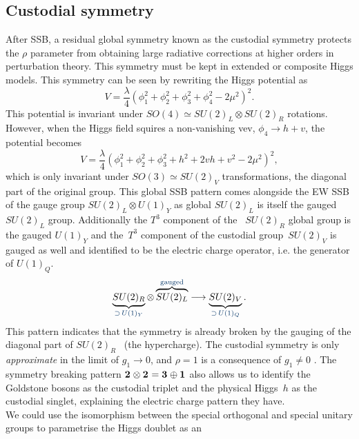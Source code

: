 \subsection{Custodial symmetry}
After SSB, a residual global symmetry known as the custodial symmetry protects the $\rho$ parameter from obtaining large radiative corrections at higher orders in perturbation theory.  This symmetry must be kept in extended or composite Higgs models. This symmetry can be seen by rewriting the Higgs potential as
\begin{equation}
	V = \frac{\lambda}{4} \left( \phi_1^2+\phi^2_2+\phi_3^2+\phi^2_4 -2 \mu^2\right)^2.
\end{equation}
This potential is invariant under $SO(4)\simeq SU(2)_L \otimes SU(2)_R$ rotations. However, when the Higgs field squires a non-vanishing vev,  $ \phi_4 \to h+v$, the potential becomes
 \begin{equation}
 	V = \frac{\lambda}{4} \left( \phi_1^2+\phi^2_2+\phi_3^2+ h^2+2vh+v^2 -2 \mu^2\right)^2,
 \end{equation}
which is only invariant under  $SO(3)\simeq SU(2)_V$ transformations, the diagonal part of the original group. This global SSB pattern comes alongside the EW SSB of the gauge group $SU(2)_L \otimes U(1)_Y$ as global $SU(2)_L$ is itself the gauged $SU(2)_L$  group. Additionally the $T^3$ component of the ~$SU(2)_R$ global group is the gauged $U(1)_Y$ and the~$T^3$ component of the custodial group~$SU(2)_V$ is gauged as well and identified to be the electric charge operator, i.e. the generator of $U(1)_Q$. 
\begin{equation}
	\underbrace{SU(2)_R}_{{\color{myblue} \supset\, U(1)_Y}} \otimes \overbrace{SU(2)_L}^{{\color{myblue} \text{gauged}}} \longrightarrow \underbrace{SU(2)_V}_{{\color{myblue} \supset\, U(1)_Q}} .
\end{equation}
This pattern indicates that the symmetry is already broken by the gauging of the diagonal part of $SU(2)_R$ ~(the hypercharge). The custodial symmetry is only \emph{approximate} in the limit of $ g_1 \to 0$, and $\rho=1$ is a consequence of $g_1\neq 0$ . The symmetry breaking pattern $\irrep{2} \otimes \irrep{2} = \irrep{3} \oplus \irrep{1}$ also allows us to identify the Goldstone bosons as the custodial triplet and the physical Higgs~$h$ as the custodial singlet, explaining the electric charge pattern they have.   \\
 We could use the isomorphism between the special orthogonal and special unitary groups to parametrise the Higgs doublet as an 
